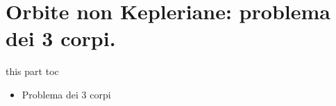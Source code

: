 \documentclass[10pt,xcolor={usenames},fleqn,mathserif,serif]{beamer}
\begin{document}



\part{Orbite non Kepleriane: problema dei 3 corpi.}\label{part:threebody}
\frame{\partpage}

\begin{frame}{this part toc}

\begin{itemize}

\item Problema dei 3 corpi

\end{itemize}


\end{frame}



\end{document}
